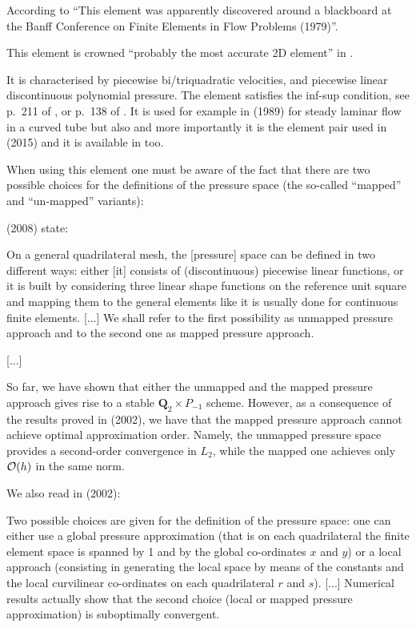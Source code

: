 According to \textcite{bobf08} 
{\color{darkgray} ``This element was apparently discovered 
around a blackboard at the Banff Conference on Finite Elements in 
Flow Problems (1979)''}.

\begin{center}

\end{center}

This element is crowned ``probably the most accurate 2D element'' in \textcite{grsa}.

It is characterised by piecewise bi/triquadratic velocities, 
and piecewise linear discontinuous polynomial pressure. 
The element satisfies the inf-sup condition, see p.~211 of \textcite{hugh}, or 
p.~138 of \textcite{elsw}.
It is used for example in \textcite{vavs89} (1989) for steady laminar flow in a curved tube
but also and more importantly it is the element pair used in \textcite{mabl15} (2015)
and it is available in \aspect too. 


When using this element one must be aware of the fact that there are 
two possible choices for the definitions of the pressure space 
(the so-called ``mapped'' and ``un-mapped'' variants):

\textcite{bobf08} (2008) state: 
\begin{displayquote}
{\color{darkgray}
On a general quadrilateral mesh, the [pressure] space 
can be defined in two different ways: either [it] 
consists of (discontinuous) piecewise linear functions, or it is built
by considering three linear shape functions on the reference unit square and mapping
them to the general elements like it is usually done for continuous 
finite elements. [...] We shall refer to the first possibility as 
unmapped pressure approach and to the second one as mapped pressure approach.

[...] 

So far, we have shown that either the 
unmapped and the mapped pressure 
approach gives rise to a stable ${\bm Q}_2\times P_{-1}$ scheme. 
However, as a consequence of the
results proved in \textcite{arbf02} (2002), we have that the mapped 
pressure approach cannot achieve 
optimal approximation order. Namely, the unmapped pressure space 
provides a second-order convergence 
in $L_2$, while the mapped one achieves only ${\cal O}(h)$ in the same norm.}
\end{displayquote}

We also read in \textcite{boga02} (2002):
\begin{displayquote}
{\color{darkgray}
Two possible choices are given for the definition of the pressure space: 
one can either use a global pressure approximation (that is on
each quadrilateral the finite element space is spanned by 1 and by the 
global co-ordinates $x$ and $y$) or a local approach (consisting in generating 
the local space by means of the constants and the local curvilinear 
co-ordinates on each quadrilateral $r$ and $s$). [...] Numerical results 
actually show that the second choice (local or mapped pressure approximation) 
is suboptimally convergent.
}
\end{displayquote}

